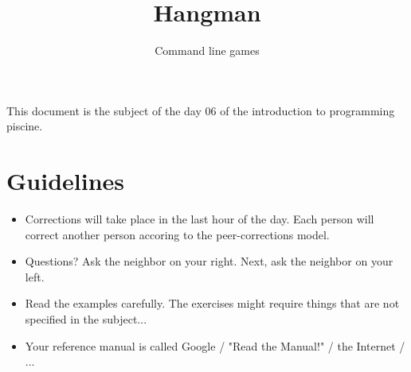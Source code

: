 \documentclass{42-en}
\begin{document}
\title{Hangman}
\subtitle{Command line games}


\summary
{
This document is the subject of the day 06 of the introduction to programming piscine.
}

\maketitle

\tableofcontents



\chapter{Guidelines}

\begin{itemize}

  \item Corrections will take place in the last hour of the day. Each person will correct another person accoring to the peer-corrections model.
 
  \item Questions? Ask the neighbor on your right. Next, ask the neighbor on your left.
  
  \item Read the examples carefully. The exercises might require things that are not specified in the subject...

  \item Your reference manual is called Google / "Read the Manual!" / the Internet / ...

\end{itemize}

\newpage


\end{document}
